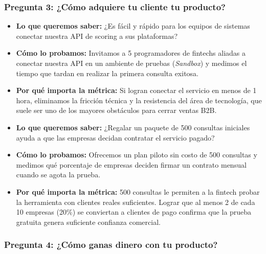 \documentclass[11pt,a4paper]{article}
\begin{document}
\subsubsection{Pregunta 3: ¿Cómo adquiere tu cliente tu producto?}

\begin{tcolorbox}[colback=lightgray,colframe=secondary,title=\textbf{Experimento 3.1: Prueba de facilidad de integración de la API}]
\begin{itemize}[leftmargin=*]
    \item \textbf{Lo que queremos saber:} ¿Es fácil y rápido para los equipos de sistemas conectar nuestra API de scoring a sus plataformas?
    \item \textbf{Cómo lo probamos:} Invitamos a 5 programadores de fintechs aliadas a conectar nuestra API en un ambiente de pruebas (\textit{Sandbox}) y medimos el tiempo que tardan en realizar la primera consulta exitosa.
    \item \textbf{Por qué importa la métrica:} Si logran conectar el servicio en menos de 1 hora, eliminamos la fricción técnica y la resistencia del área de tecnología, que suele ser uno de los mayores obstáculos para cerrar ventas B2B.
\end{itemize}
\end{tcolorbox}

\begin{tcolorbox}[colback=lightgray,colframe=secondary,title=\textbf{Experimento 3.2: Prueba de versión gratuita inicial (Freemium Pilot)}]
\begin{itemize}[leftmargin=*]
    \item \textbf{Lo que queremos saber:} ¿Regalar un paquete de 500 consultas iniciales ayuda a que las empresas decidan contratar el servicio pagado?
    \item \textbf{Cómo lo probamos:} Ofrecemos un plan piloto sin costo de 500 consultas y medimos qué porcentaje de empresas deciden firmar un contrato mensual cuando se agota la prueba.
    \item \textbf{Por qué importa la métrica:} 500 consultas le permiten a la fintech probar la herramienta con clientes reales suficientes. Lograr que al menos 2 de cada 10 empresas (20\%) se conviertan a clientes de pago confirma que la prueba gratuita genera suficiente confianza comercial.
\end{itemize}
\end{tcolorbox}

\subsubsection{Pregunta 4: ¿Cómo ganas dinero con tu producto?}
\end{document}
